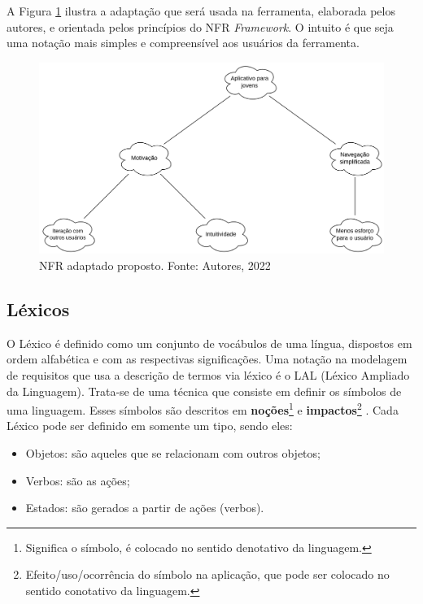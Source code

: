 A Figura \ref{fig:nfr_example} ilustra a adaptação que será usada na ferramenta, elaborada pelos autores, e orientada pelos princípios do NFR \textit{Framework}. O intuito é que seja uma notação mais simples e compreensível aos usuários da ferramenta.

\begin{figure}[H]
    \begin{center}
        \includegraphics[scale=0.60]{figuras/Embasamento/nfr_adaptado.png}
        \caption{{NFR adaptado proposto. Fonte: Autores, 2022}}
        \label{fig:nfr_example}
    \end{center}
\end{figure}


\subsection{Léxicos}

\label{sec:lexicos}

O Léxico é definido como um conjunto de vocábulos de uma língua, dispostos em ordem alfabética e com as respectivas significações. Uma notação na modelagem de requisitos que usa a descrição de termos via léxico é o LAL (Léxico Ampliado da Linguagem). Trata-se de uma técnica que consiste em definir os símbolos de uma linguagem. Esses símbolos são descritos em \textbf{noções}\footnote{Significa o símbolo, é colocado no sentido denotativo da linguagem.} e \textbf{impactos}\footnote{Efeito/uso/ocorrência do símbolo na aplicação, que pode ser colocado no sentido conotativo da linguagem.} \cite{leite1993strategy}. Cada Léxico pode ser definido em somente um tipo, sendo eles:

\begin{itemize}
    \item Objetos: são aqueles que se relacionam com outros objetos;
    \item Verbos: são as ações;
    \item Estados: são gerados a partir de ações (verbos).
\end{itemize}

